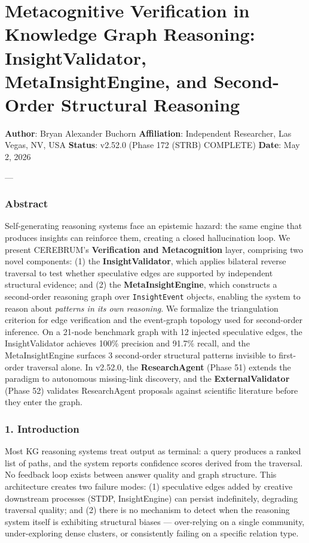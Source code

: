 \section{Metaco\-gnitive Verifi\-cation in Knowledge Graph Reasoning: InsightValidator, MetaInsightEngine, and Second-Order Structural Reasoning}

\textbf{Author}: Bryan Alexander Buchorn  
\textbf{Affiliation}: Independent Researcher, Las Vegas, NV, USA  
\textbf{Status}: v2.52.0 (Phase 172 (STRB) COMPLETE)
\textbf{Date}: May 2, 2026

---

\subsubsection{Abstract}
Self-generating reasoning systems face an epistemic hazard: the same engine that produces insights can reinforce them, creating a closed hallu\-cination loop. We present CEREBRUM's \textbf{Verifi\-cation and Metaco\-gnition} layer, comprising two novel components: (1) the \textbf{InsightValidator}, which applies bilateral reverse traversal to test whether speculative edges are supported by independent structural evidence; and (2) the \textbf{MetaInsightEngine}, which constructs a second-order reasoning graph over \texttt{InsightEvent} objects, enabling the system to reason about \textit{patterns in its own reasoning}. We formalize the trian\-gulation criterion for edge verif\-ication and the event-graph topology used for second-order inference. On a 21-node benchmark graph with 12 injected speculative edges, the InsightValidator achieves 100\% precision and 91.7\% recall, and the MetaInsightEngine surfaces 3 second-order structural patterns invisible to first-order traversal alone. In v2.52.0, the \textbf{ResearchAgent} (Phase 51) extends the paradigm to autonomous missing-link discovery, and the \textbf{ExternalValidator} (Phase 52) validates ResearchAgent proposals against scientific literature before they enter the graph.

\subsubsection{1. Introd\-uction}
Most KG reasoning systems treat output as terminal: a query produces a ranked list of paths, and the system reports confidence scores derived from the traversal. No feedback loop exists between answer quality and graph structure. This archi\-tecture creates two failure modes: (1) speculative edges added by creative downstream processes (STDP, InsightEngine) can persist indef\-initely, degrading traversal quality; and (2) there is no mechanism to detect when the reasoning system itself is exhibiting structural biases — over-relying on a single community, under-exploring dense clusters, or consi\-stently failing on a specific relation type.

